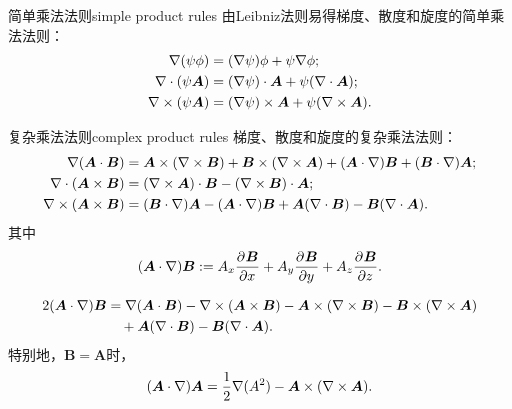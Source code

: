 \begin{theorem}
    {简单乘法法则}{simple product rules}
    由Leibniz法则易得梯度、散度和旋度的简单乘法法则：
    \begin{align}
        \nabla(\psi\phi) &= (\nabla\psi)\phi + \psi\nabla\phi;\\
        \nabla\cdot(\psi\bm A) &= (\nabla\psi) \cdot \bm A + \psi(\nabla\cdot\bm A);\\
        \nabla\times(\psi\bm A) &= (\nabla\psi) \times \bm A + \psi(\nabla\times\bm A).
    \end{align}
\end{theorem}

\begin{theorem}
    {复杂乘法法则}{complex product rules}
    梯度、散度和旋度的复杂乘法法则：
    \begin{align}
        \label{eqn:gradA.B}
        \nabla(\bm A \cdot \bm B) &= \bm A \times (\nabla\times\bm B) + \bm B \times (\nabla\times\bm A) + (\bm A \cdot \nabla)\bm B + (\bm B \cdot \nabla)\bm A;\\
        \label{eqn:divAxB}
        \nabla\cdot(\bm A \times \bm B) &= (\nabla\times\bm A) \cdot \bm B - (\nabla\times\bm B) \cdot \bm A;\\
        \label{eqn:curlAxB}
        \nabla\times(\bm A \times \bm B) &= (\bm B \cdot \nabla)\bm A - (\bm A \cdot \nabla)\bm B + \bm A(\nabla\cdot\bm B) - \bm B(\nabla\cdot\bm A).
    \end{align}
    其中
    \begin{equation}
        (\bm A \cdot \nabla)\bm B := A_x\frac{\partial^{}\bm B}{\partial{x}^{}} + A_y\frac{\partial^{}\bm B}{\partial{y}^{}} + A_z\frac{\partial^{}\bm B}{\partial{z}^{}}.
    \end{equation}
\end{theorem}

\begin{corollary}
    \begin{equation}
        \begin{aligned}
            2(\bm A \cdot \nabla)\bm B
               &= \nabla(\bm A \cdot \bm B) - \nabla\times(\bm A \times \bm B)
                  - \bm A \times (\nabla\times\bm B) - \bm B \times (\nabla\times\bm A)\\
               &\quad +\bm A(\nabla\cdot\bm B) - \bm B(\nabla\cdot\bm A).
        \end{aligned}
    \end{equation}
    特别地，$\bm B = \bm A$时，
    \begin{equation}
        (\bm A \cdot \nabla)\bm A = \frac12\nabla(A^2) - \bm A \times (\nabla\times\bm A).
    \end{equation}
\end{corollary}

